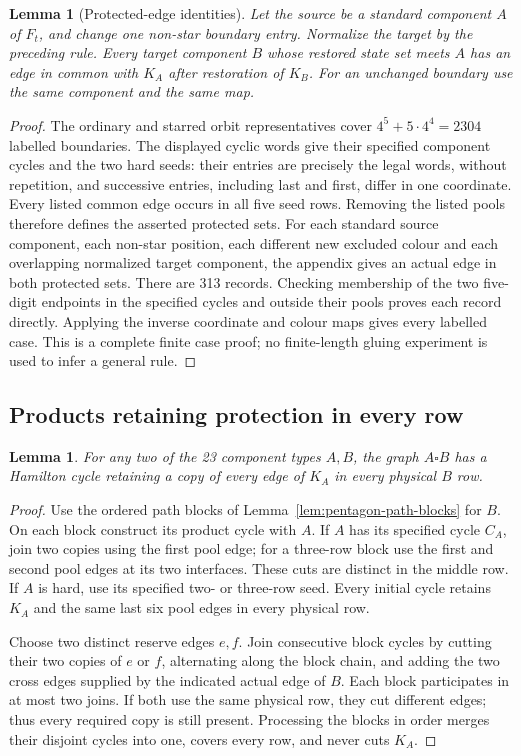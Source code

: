 \documentclass[11pt]{article}
\newtheorem{lemma}[theorem]{Lemma}
\theoremstyle{remark}
\numberwithin{equation}{section}
\numberwithin{table}{section}
\begin{document}
\begin{lemma}[Protected-edge identities]\label{lem:pentagon-protection}
Let the source be a standard component $A$ of $F_t$, and change one
non-star boundary entry. Normalize the target by the preceding rule.
Every target component $B$ whose restored state set meets $A$ has an
edge in common with $K_A$ after restoration of $K_B$.
For an unchanged boundary use the same component and the same map.
\end{lemma}
\begin{proof}
The ordinary and starred orbit representatives cover
$4^5+5\cdot4^4=2304$ labelled boundaries. The displayed cyclic words
give their specified component cycles and the two hard seeds: their
entries are precisely the legal words, without repetition, and
successive entries, including last and first, differ in one coordinate.
Every listed common edge occurs in all five seed rows.
Removing the listed pools therefore defines the asserted protected sets.
For each standard source component, each non-star position, each
different new excluded colour and each overlapping normalized target
component, the appendix gives an actual edge in both protected sets.
There are 313 records. Checking membership of the two five-digit
endpoints in the specified cycles and outside their pools proves
each record directly. Applying the inverse coordinate and colour maps
gives every labelled case. This is a complete finite case proof;
no finite-length gluing experiment is used to infer a general rule.
\end{proof}

\subsection{Products retaining protection in every row}
\begin{lemma}\label{lem:protected-product}
For any two of the 23 component types $A,B$, the graph $A\square B$
has a Hamilton cycle retaining a copy of every edge of $K_A$
in every physical $B$ row.
\end{lemma}
\begin{proof}
Use the ordered path blocks of Lemma~\ref{lem:pentagon-path-blocks}
for $B$. On each block construct its product cycle with $A$.
If $A$ has its specified cycle $C_A$, join two copies using the
first pool edge; for a three-row block use the first and second
pool edges at its two interfaces. These cuts are distinct in the
middle row. If $A$ is hard, use its specified two- or three-row seed.
Every initial cycle retains $K_A$ and the same last six pool edges
in every physical row.

Choose two distinct reserve edges $e,f$. Join consecutive block
cycles by cutting their two copies of $e$ or $f$, alternating along
the block chain, and adding the two cross edges supplied by the
indicated actual edge of $B$. Each block participates in at most two
joins. If both use the same physical row, they cut different edges;
thus every required copy is still present. Processing the blocks in
order merges their disjoint cycles into one, covers every row, and
never cuts $K_A$.
\end{proof}
\end{document}
